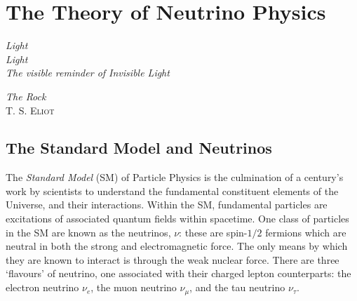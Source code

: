 
\chapter{The Theory of Neutrino Physics}\label{chap:theory}
\setlength{\epigraphwidth}{.45\textwidth}
\epigraph{\textit{Light\\Light\\The visible reminder of Invisible Light}}{\textit{The Rock}\\\textsc{T. S. Eliot}}
\setlength{\epigraphwidth}{.4\textwidth}

\section{The Standard Model and Neutrinos}
The \textit{Standard Model} (SM) of Particle Physics is the culmination of a century's work by scientists to understand the fundamental constituent elements of the Universe, and their interactions. Within the SM, fundamental particles are excitations of associated quantum fields within spacetime. One class of particles in the SM are known as the neutrinos, $\nu$: these are spin-$1/2$ fermions which are neutral in both the strong and electromagnetic force. The only means by which they are known to interact is through the weak nuclear force. There are three `flavours' of neutrino, one associated with their charged lepton counterparts: the electron neutrino $\nu_e$, the muon neutrino $\nu_\mu$, and the tau neutrino $\nu_\tau$.

